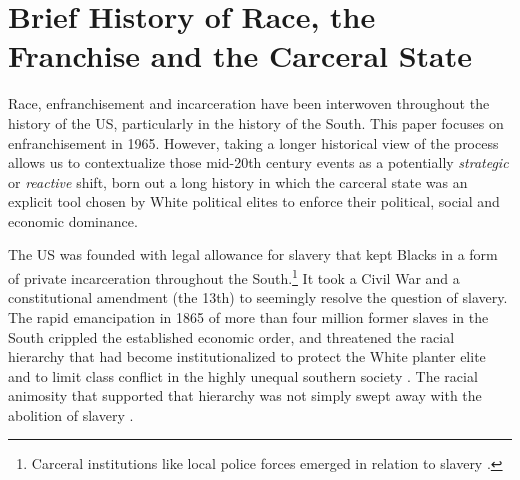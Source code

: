 \documentclass[12pt]{article}
\begin{document}
\singlespacing





\clearpage \newpage
\section{Brief History of Race, the Franchise and the Carceral State}\label{appendix_history}
\setcounter{table}{0}
\setcounter{figure}{0}
\renewcommand{\thetable}{A\arabic{table}}
\renewcommand{\thefigure}{A\arabic{figure}}
\normalsize


Race, enfranchisement and incarceration have been interwoven throughout the history of the US, particularly in the history of the South.  This paper focuses on enfranchisement in 1965.  However, taking a longer historical view of the process allows us to contextualize those mid-20th century events as a potentially \emph{strategic} or \emph{reactive} shift, born out a long history in which the carceral state was an explicit tool chosen by White political elites to enforce their political, social and economic dominance.

The US was founded with legal allowance for slavery that kept Blacks in a form of private incarceration throughout the South.\footnote{Carceral institutions like local police forces emerged in relation to slavery .}  It took a Civil War and a constitutional amendment (the 13th) to seemingly resolve the question of slavery.  The rapid emancipation in 1865 of more than four million former slaves in the South crippled the established economic order, and threatened the racial hierarchy that had become institutionalized to protect the White planter elite and to limit class conflict in the highly unequal southern society .  The racial animosity that supported that hierarchy was not simply swept away with the abolition of slavery .
\end{document}
